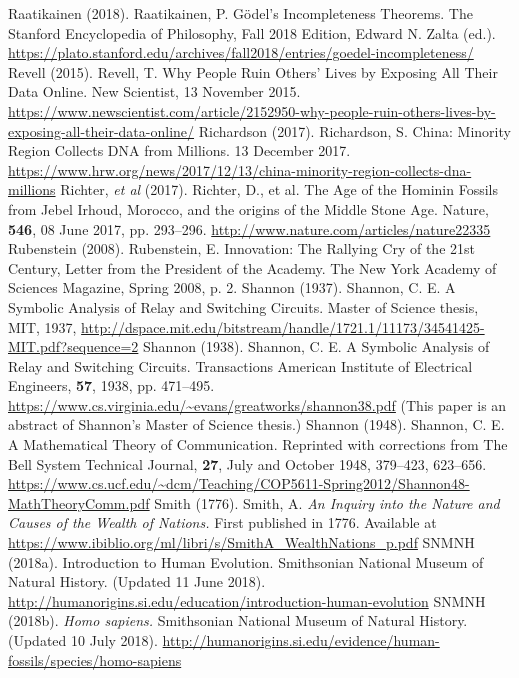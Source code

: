 \begin{multicols}{2}
\begin{thebibliography}{99}
 Raatikainen (2018). Raatikainen, P. Gödel’s Incompleteness Theorems. The Stanford Encyclopedia of Philosophy, Fall 2018 Edition, Edward N. Zalta (ed.). \url{https://plato.stanford.edu/archives/fall2018/entries/goedel-incompleteness/}
 Revell (2015). Revell, T. Why People Ruin Others’ Lives by Exposing All Their Data Online. New Scientist, 13 November 2015. \url{https://www.newscientist.com/article/2152950-why-people-ruin-others-lives-by-exposing-all-their-data-online/}
 Richardson (2017). Richardson, S. China: Minority Region Collects DNA from Millions. 13 December 2017. \url{https://www.hrw.org/news/2017/12/13/china-minority-region-collects-dna-millions}
 Richter, \textit{et al} (2017). Richter, D., et al. The Age of the Hominin Fossils from Jebel Irhoud, Morocco, and the origins of the Middle Stone Age. Nature, \textbf{546}, 08 June 2017, pp. 293--296. \url{http://www.nature.com/articles/nature22335}
 Rubenstein (2008). Rubenstein, E. Innovation: The Rallying Cry of the 21st Century, Letter from the President of the Academy. The New York Academy of Sciences Magazine, Spring 2008, p. 2.
 Shannon (1937). Shannon, C. E. A Symbolic Analysis of Relay and Switching Circuits. Master of Science thesis, MIT, 1937, \url{http://dspace.mit.edu/bitstream/handle/1721.1/11173/34541425-MIT.pdf?sequence=2}
 Shannon (1938). Shannon, C. E. A Symbolic Analysis of Relay and Switching Circuits. Transactions American Institute of Electrical Engineers, \textbf{57}, 1938, pp. 471--495. \url{https://www.cs.virginia.edu/~evans/greatworks/shannon38.pdf} (This paper is an abstract of Shannon’s Master of Science thesis.)
 Shannon (1948). Shannon, C. E. A Mathematical Theory of Communication. Reprinted with corrections from The Bell System Technical Journal, \textbf{27}, July and October 1948, 379–423, 623–656. \url{https://www.cs.ucf.edu/~dcm/Teaching/COP5611-Spring2012/Shannon48-MathTheoryComm.pdf}
 Smith (1776). Smith, A. \textit{An Inquiry into the Nature and Causes of the Wealth of Nations.} First published in 1776. Available at \url{https://www.ibiblio.org/ml/libri/s/SmithA_WealthNations_p.pdf}
 SNMNH (2018a). Introduction to Human Evolution. Smithsonian National Museum of Natural History. (Updated 11 June 2018). \url{http://humanorigins.si.edu/education/introduction-human-evolution}
 SNMNH (2018b). \textit{Homo sapiens.} Smithsonian National Museum of Natural History. (Updated 10 July 2018). \url{http://humanorigins.si.edu/evidence/human-fossils/species/homo-sapiens}

\end{thebibliography}
\end{multicols}
